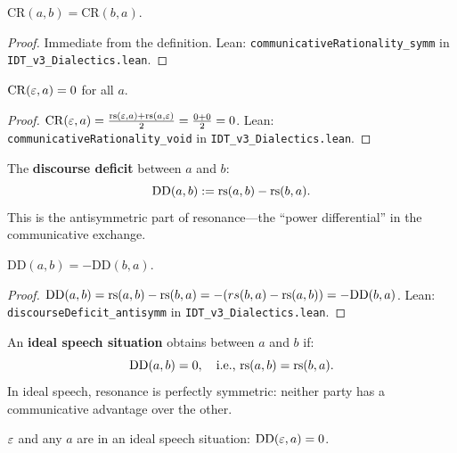 \begin{theorem}
\label{thm:cr-symm}
$\mathrm{CR}(a, b) = \mathrm{CR}(b, a)$.
\end{theorem}

\begin{proof}
Immediate from the definition.
Lean: \texttt{communicativeRationality\_symm} in
\texttt{IDT\_v3\_Dialectics.lean}.
\end{proof}

\begin{theorem}
\label{thm:cr-void}
$\mathrm{CR}(\varepsilon, a) = 0$ for all $a$.
\end{theorem}

\begin{proof}
$\mathrm{CR}(\varepsilon, a) = \frac{\mathrm{rs}(\varepsilon, a) + \mathrm{rs}(a, \varepsilon)}{2}
= \frac{0 + 0}{2} = 0$.
Lean: \texttt{communicativeRationality\_void} in
\texttt{IDT\_v3\_Dialectics.lean}.
\end{proof}

\begin{definition}
\label{def:discourse-deficit}
The \textbf{discourse deficit} between $a$ and $b$:
\[
\mathrm{DD}(a, b) := \mathrm{rs}(a, b) - \mathrm{rs}(b, a).
\]
This is the antisymmetric part of resonance---the ``power differential'' in
the communicative exchange.
\end{definition}

\begin{theorem}
\label{thm:dd-antisymm}
$\mathrm{DD}(a, b) = -\mathrm{DD}(b, a)$.
\end{theorem}

\begin{proof}
$\mathrm{DD}(a, b) = \mathrm{rs}(a, b) - \mathrm{rs}(b, a) = -(rs(b, a) - \mathrm{rs}(a, b))
= -\mathrm{DD}(b, a)$.
Lean: \texttt{discourseDeficit\_antisymm} in
\texttt{IDT\_v3\_Dialectics.lean}.
\end{proof}

\begin{definition}
\label{def:ideal-speech}
An \textbf{ideal speech situation} obtains between $a$ and $b$ if:
\[
\mathrm{DD}(a, b) = 0, \quad\text{i.e., } \mathrm{rs}(a, b) = \mathrm{rs}(b, a).
\]
In ideal speech, resonance is perfectly symmetric: neither party has a
communicative advantage over the other.
\end{definition}

\begin{theorem}
\label{thm:void-ideal}
$\varepsilon$ and any $a$ are in an ideal speech situation: $\mathrm{DD}(\varepsilon, a) = 0$.
\end{theorem}

